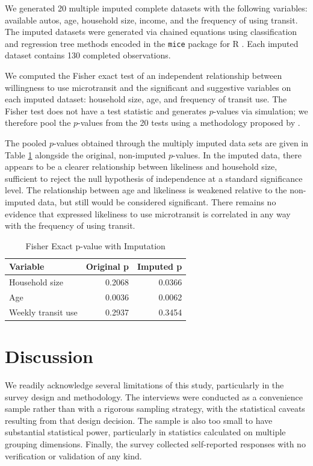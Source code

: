 \documentclass[smartcities,article,submit,moreauthors,pdftex]{Definitions/mdpi}
\begin{document}
We generated 20 multiple imputed complete datasets with the following variables: available autos, age, household size, income, and the frequency of using transit. The imputed datasets were generated via chained equations using classification and regression tree methods encoded in the \texttt{mice} package for R \citep{mice2011, R-base}. Each imputed dataset contains 130 completed observations.

We computed the Fisher exact test of an independent relationship between willingness to use microtransit and the significant and suggestive variables on each imputed dataset: household size, age, and frequency of transit use. The Fisher test does not have a test statistic and generates \(p\)-values via simulation; we therefore pool the \(p\)-values from the 20 tests using a methodology proposed by \citet{LichtThesis}.

The pooled \(p\)-values obtained through the multiply imputed data sets are given in Table \ref{tab:mi-fishers-table} alongside the original, non-imputed \(p\)-values. In the imputed data, there appears to be a clearer relationship between likeliness and household size, sufficient to reject the null hypothesis of independence at a standard significance level. The relationship between age and likeliness is weakened relative to the non-imputed data, but still would be considered significant. There remains no evidence that expressed likeliness to use microtransit is correlated in any way with the frequency of using transit.

\begin{table}[ht]
    \centering
    \caption{Fisher Exact p-value with Imputation}
    \label{tab:mi-fishers-table}
\begin{tabular}[t]{lrr}
\toprule
Variable & Original p & Imputed p\\
\midrule
Household size & 0.2068 & 0.0366\\
Age & 0.0036 & 0.0062\\
Weekly transit use & 0.2937 & 0.3454\\
\bottomrule
\end{tabular}
\end{table}

\section{Discussion}
We readily acknowledge several limitations of this study, particularly in the survey design and methodology. The interviews were conducted as a convenience sample rather than with a rigorous sampling strategy, with the statistical caveats resulting from that design decision. The sample is also too small to have substantial statistical power, particularly in statistics calculated on multiple grouping dimensions. Finally, the survey collected self-reported responses with no verification or validation of any kind.
\end{document}

